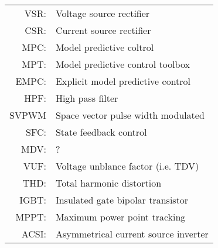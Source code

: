 \begin{longtable}{r l}
  VSR:      & Voltage source rectifier \\
  CSR:      & Current source rectifier \\
  MPC:      & Model predictive coltrol\\
  MPT:      & Model predictive control toolbox\\
  EMPC:     & Explicit model predictive control\\
  HPF:      & High pass filter\\
  SVPWM     & Space vector pulse width modulated\\
  SFC:      & State feedback control\\
  MDV:      & ?\\
  VUF:      & Voltage unblance factor (i.e. TDV)\\
  THD:      & Total harmonic distortion\\
  IGBT:     & Insulated gate bipolar transistor\\
  MPPT:     & Maximum power point tracking\\
	ACSI:			& Asymmetrical current source inverter\\

\end{longtable} 